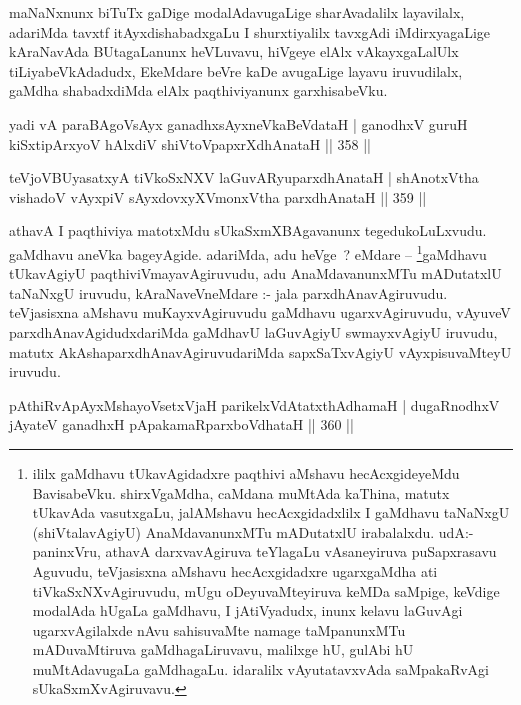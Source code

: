 \begin{artha}
maNaNxnunx biTuTx gaDige modalAdavugaLige sharAvadalilx layavilalx, adariMda tavxtf itAyxdishabadxgaLu I shurxtiyalilx tavxgAdi iMdirxyagaLige kAraNavAda BUtagaLanunx heVLuvavu, hiVgeye elAlx vAkayxgaLalUlx tiLiyabeVkAdadudx, EkeMdare beVre kaDe avugaLige layavu iruvudilalx, gaMdha shabadxdiMda elAlx paqthiviyanunx garxhisabeVku.
\end{artha}

\begin{shl}
yadi vA paraBAgoV\s sAyx ganadhxsAyxneVkaBeVdataH |
ganodhxV guruH kiSxtipArxyoV hAlxdiV shiVtoV\s papxrXdhAnataH \hfill || 358 ||
\end{shl}

\begin{shl}
teVjoVBUyasatxyA tiVkoSxNXV laGuvARyuparxdhAnataH |
shAnotxV\s tha vishadoV vAyxpiV sAyxdovxyXVmonxV\s tha parxdhAnataH \hfill || 359 ||
\end{shl}

\begin{artha}
athavA I paqthiviya matotxMdu sUkaSxmXBAgavanunx tegedukoLuLxvudu. gaMdhavu aneVka bageyAgide. adariMda, adu heVge~? eMdare -- \footnote[1]{ililx gaMdhavu tUkavAgidadxre paqthivi aMshavu hecAcxgideyeMdu BavisabeVku. shirxVgaMdha, caMdana muMtAda kaThina, matutx tUkavAda vasutxgaLu, jalAMshavu hecAcxgidadxlilx I gaMdhavu taNaNxgU (shiVtalavAgiyU) AnaMdavanunxMTu mADutatxlU irabalalxdu. udA:- paninxVru, athavA darxvavAgiruva teYlagaLu vAsaneyiruva puSapxrasavu Aguvudu, teVjasisxna aMshavu hecAcxgidadxre ugarxgaMdha ati tiVkaSxNXvAgiruvudu, mUgu oDeyuvaMteyiruva keMDa saMpige, keVdige modalAda hUgaLa gaMdhavu, I jAtiVyadudx, inunx kelavu laGuvAgi ugarxvAgilalxde nAvu sahisuvaMte namage taMpanunxMTu mADuvaMtiruva gaMdhagaLiruvavu, malilxge hU, gulAbi hU muMtAdavugaLa gaMdhagaLu. idaralilx vAyutatavxvAda saMpakaRvAgi sUkaSxmXvAgiruvavu.}gaMdhavu tUkavAgiyU paqthiviVmayavAgiruvudu, adu AnaMdavanunxMTu mADutatxlU taNaNxgU iruvudu, kAraNaveVneMdare :- jala parxdhAnavAgiruvudu. teVjasisxna aMshavu muKayxvAgiruvudu gaMdhavu ugarxvAgiruvudu, vAyuveV parxdhAnavAgidudxdariMda gaMdhavU laGuvAgiyU swmayxvAgiyU iruvudu, matutx AkAshaparxdhAnavAgiruvudariMda sapxSaTxvAgiyU vAyxpisuvaMteyU iruvudu.
\end{artha}


\begin{shl}
pAthiRvApAyxMshayoVsetxVjaH parikelxVdAtatxthA\s dhamaH |
dugaRnodhxV jAyateV ganadhxH pApakamaRparxboVdhataH \hfill || 360 ||
\end{shl}

